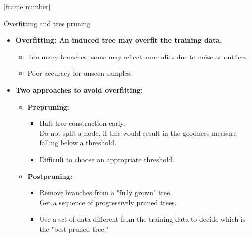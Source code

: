 \documentclass[aspectratio=169,t,table]{beamer}
\begin{document}
  {
    [frame number]
    \begin{frame}{Overfitting and tree pruning}
      \begin{itemize}
        \item \textbf{Overfitting: An induced tree may overfit the training data.}
        \begin{itemize}
          \item Too many branches, some may reflect anomalies due to noise or outliers.
          \item Poor accuracy for unseen samples.
        \end{itemize}
        \item \textbf{Two approaches to avoid overfitting:}
        \begin{itemize}
          \item \textbf{\color{airforceblue}Prepruning:}
          \begin{itemize}
            \item Halt tree construction early.\\
                  Do not split a node, if this would result in the goodness measure falling below a threshold.
            \item Difficult to choose an appropriate threshold.
          \end{itemize}
          \item \textbf{\color{airforceblue}Postpruning:}
          \begin{itemize}
            \item Remove branches from a "fully grown" tree.\\
                  Get a sequence of progressively pruned trees.
            \item Use a set of data different from the training data to decide which is the "best pruned tree."
          \end{itemize}
        \end{itemize}
      \end{itemize}
    \end{frame}
  }
\end{document}
